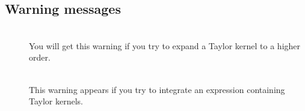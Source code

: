 \subsection{Warning messages}
\begin{description}

\item[]\mbox{}\\
    You will get this warning if you try to expand a Taylor kernel to
    a higher order.

\item[]\mbox{}\\
    This warning appears if you try to integrate an expression
    containing Taylor kernels.

\end{description}

